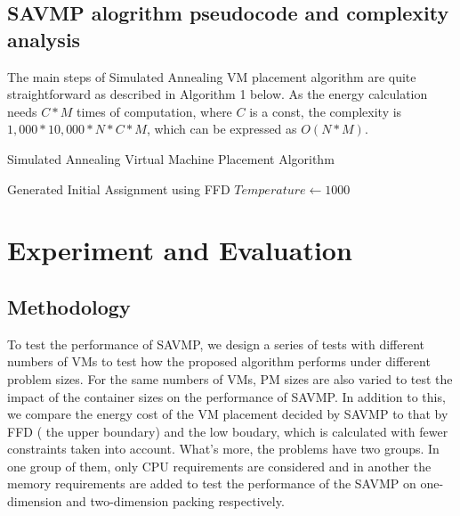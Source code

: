 \documentclass[10pt, conference, compsocconf]{IEEEtran}
\begin{document}
\subsection{SAVMP alogrithm pseudocode and complexity analysis }

The main steps of Simulated Annealing VM placement algorithm are quite
straightforward as described in Algorithm 1 below. As the energy
calculation needs $C*M$ times of computation, where $C$ is a const, the
complexity is $1,000*10,000*N*C*M$, which can be expressed as $O(N*M)$.

\begin{algorithm}[tbh]
\DontPrintSemicolon
{}
\caption{Simulated Annealing Virtual Machine Placement Algorithm}
\label{algorithm1}
	Generated Initial Assignment using FFD\;
	$Temperature\leftarrow 1000$ \;

\end{algorithm}

\section{Experiment and Evaluation}
\subsection{Methodology}
To test the performance of SAVMP, we design a series of tests with different
numbers of VMs to test how the proposed algorithm performs under different
problem sizes. For the same numbers of VMs, PM sizes are also varied to test the
impact of the container sizes on the performance of SAVMP. In addition to this,
we compare the energy cost of the VM placement decided by SAVMP to that by FFD (
the upper boundary) and the low boudary, which is calculated with fewer
constraints taken into account. What's more, the problems have two groups. In
one group of them, only CPU requirements are considered and in another the
memory requirements are added to test the performance of the SAVMP on
one-dimension and two-dimension packing respectively.
\end{document}
